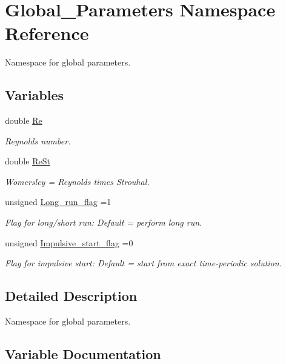 \hypertarget{namespaceGlobal__Parameters}{}\section{Global\+\_\+\+Parameters Namespace Reference}
\label{namespaceGlobal__Parameters}


Namespace for global parameters.  


\subsection*{Variables}
\begin{DoxyCompactItemize}
\item 
double \hyperlink{namespaceGlobal__Parameters_a9d72e94a9305c6a310940a6a427ebe06}{Re}
\begin{DoxyCompactList}\small\item\em Reynolds number. \end{DoxyCompactList}\item 
double \hyperlink{namespaceGlobal__Parameters_a7a59a32365e87566069e458dc83bd18a}{Re\+St}
\begin{DoxyCompactList}\small\item\em Womersley = Reynolds times Strouhal. \end{DoxyCompactList}\item 
unsigned \hyperlink{namespaceGlobal__Parameters_a457472b8222bb6bb0d97b2aed78d1ef4}{Long\+\_\+run\+\_\+flag} =1
\begin{DoxyCompactList}\small\item\em Flag for long/short run\+: Default = perform long run. \end{DoxyCompactList}\item 
unsigned \hyperlink{namespaceGlobal__Parameters_aec41eb8da4929003e5d78ef4b43c0ed9}{Impulsive\+\_\+start\+\_\+flag} =0
\begin{DoxyCompactList}\small\item\em Flag for impulsive start\+: Default = start from exact time-\/periodic solution. \end{DoxyCompactList}\end{DoxyCompactItemize}


\subsection{Detailed Description}
Namespace for global parameters. 

\subsection{Variable Documentation}
\mbox{\label{namespaceGlobal__Parameters_aec41eb8da4929003e5d78ef4b43c0ed9}} 
